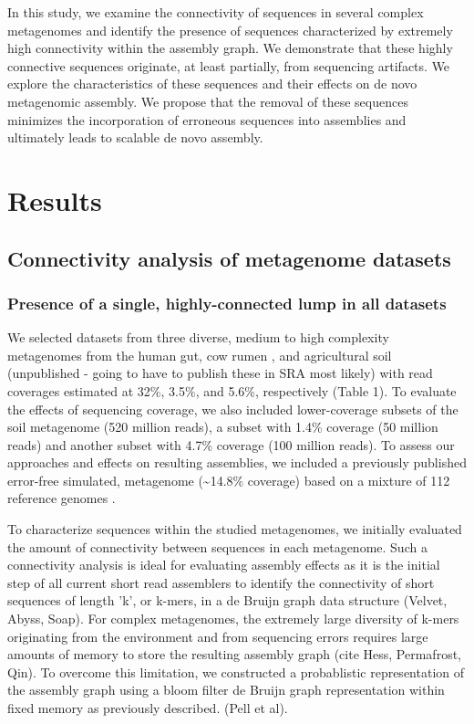 \documentclass[11pt]{article} %
\begin{document}
In this study, we examine the connectivity of sequences in several complex metagenomes and identify the presence of sequences characterized by extremely high connectivity within the assembly graph. We demonstrate that these highly connective sequences originate, at least partially, from sequencing artifacts.  We explore the characteristics of these sequences and their effects on de novo metagenomic assembly.  We propose that the removal of these sequences minimizes the incorporation of erroneous sequences into assemblies and ultimately leads to scalable de novo assembly. 

\section{Results}

\subsection{Connectivity analysis of metagenome datasets}

\subsubsection{Presence of a single, highly-connected lump in all datasets}
We selected datasets from three diverse, medium to high complexity metagenomes from the human gut\cite{Qin:2010p189}, cow rumen \cite{Hess:2011p686}, and agricultural soil (unpublished - going to have to publish these in SRA most likely) with read coverages estimated at 32\%, 3.5\%, and 5.6\%, respectively (Table 1).  To evaluate the effects of sequencing coverage, we also included lower-coverage subsets of the soil metagenome (520 million reads), a subset with 1.4\% coverage (50 million reads) and another subset with 4.7\% coverage (100 million reads).  To assess our approaches and effects on resulting assemblies, we included a previously published error-free simulated, metagenome (\textasciitilde{}14.8\% coverage) based on a mixture of 112 reference genomes \cite{Pignatelli:2011p742}.

To characterize sequences within the studied metagenomes, we initially evaluated the amount of connectivity between sequences in each metagenome.  Such a connectivity analysis is ideal for evaluating assembly effects as it is the initial step of all current short read assemblers to identify the connectivity of short sequences of length 'k', or k-mers, in a de Bruijn graph data structure (Velvet, Abyss, Soap).  For complex metagenomes, the extremely large diversity of k-mers originating from the environment and from sequencing errors requires large amounts of memory to store the resulting assembly graph (cite Hess, Permafrost, Qin).  To overcome this limitation, we constructed a probablistic representation of the assembly graph using a bloom filter de Bruijn graph representation within fixed memory as previously described.  (Pell et al).  
\end{document}

